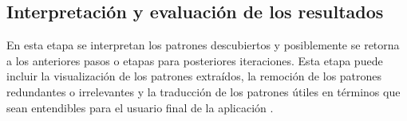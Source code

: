 \subsection{Interpretación y evaluación de los resultados \cite{key-50,key-100}}
En esta etapa se interpretan los patrones descubiertos y posiblemente se retorna a los anteriores pasos o etapas para posteriores iteraciones. Esta etapa puede incluir la visualización de los patrones extraídos, la remoción de los patrones redundantes o irrelevantes y la traducción de los patrones útiles en términos que sean entendibles para el usuario final de la aplicación \cite{key-100}.